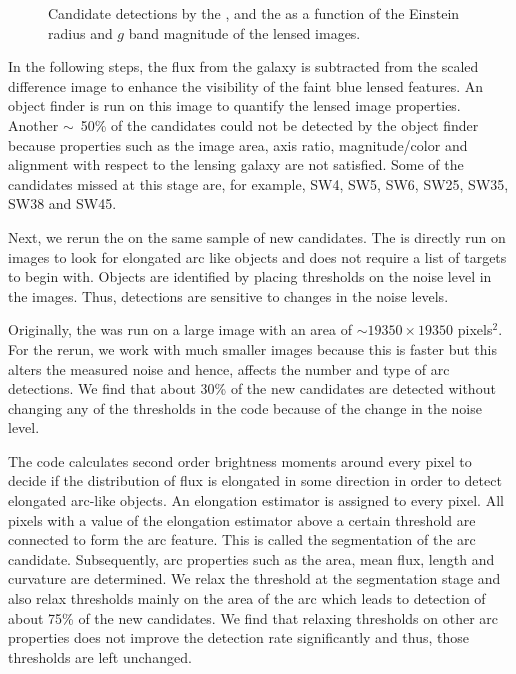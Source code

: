 \documentclass[useAMS,usenatbib,a4paper]{mn2e}
\begin{document}
\begin{figure}
\begin{center}
\caption{ \label{fig:stackremg}
Candidate detections by the \rf, \sw and the \af as a
function of the Einstein radius and $g$ band magnitude of the lensed
images.
}
\end{center}
\end{figure}

In the following steps, the flux from the galaxy is subtracted from the
scaled difference image to enhance the visibility of the faint blue
lensed features. An object finder is run on this image to quantify the
lensed image properties. Another $\sim$~50\% of the \sw candidates could not be
detected by the object finder because properties such as the image area,
axis ratio, magnitude/color and alignment with respect to the lensing
galaxy are not satisfied. Some of the candidates missed at this stage
are, for example, SW4, SW5, SW6, SW25, SW35, SW38 and SW45.


Next, we rerun the \af on the same \sw sample of new candidates. The \af
is directly run on images to look for elongated arc like objects and does
not require a list of targets to begin with. Objects are identified by
placing thresholds on the noise level in the images. Thus, \af
detections are sensitive to changes in the noise levels.

Originally, the \af was run on a large image with an area of $\sim 19350
\times 19350$ pixels$^2$. For the rerun, we work with much smaller
images because this is faster but this alters the measured
noise and hence, affects the number and type of arc detections. We find
that about 30\% of the new candidates are detected without changing any
of the thresholds in the code because of the change in the noise level.

The \af code calculates second order brightness moments around every
pixel to decide if the distribution of flux is elongated in some
direction in order to detect elongated arc-like objects. An elongation
estimator is assigned to every pixel. All pixels with a value of the
elongation estimator above a certain threshold are connected to form the arc
feature. This is called the segmentation of the arc candidate. Subsequently, arc
properties such as the area, mean flux, length and curvature are
determined. We relax the threshold at the segmentation stage and also relax
thresholds mainly on the area of the arc which leads to detection of
about 75\% of the new \sw candidates. We find that relaxing thresholds
on other arc properties does not improve the detection rate significantly
and thus, those thresholds are left unchanged.
\end{document}
